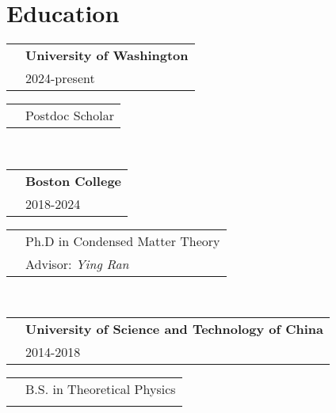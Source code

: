 \documentclass[10pt, letterpaper]{article}
\begin{document}
\section*{Education}
\begin{minipage}{0.55\linewidth}
    \begin{tabular}{ll}
         & {\bf University of Washington} \\
         & 2024-present
    \end{tabular}
\end{minipage}
\begin{minipage}{0.45\linewidth}
    \begin{tabular}{ll}
         & Postdoc Scholar \\
    \end{tabular}
\end{minipage}
\\[1em]
\begin{minipage}{0.55\linewidth}
    \begin{tabular}{ll}
         & {\bf Boston College} \\
         & 2018-2024
    \end{tabular}
\end{minipage}
\begin{minipage}{0.45\linewidth}
    \begin{tabular}{ll}
         & Ph.D in Condensed Matter Theory \\
         & Advisor: \emph{Ying Ran}
    \end{tabular}
\end{minipage}
\\[1em]
\begin{minipage}{0.55\linewidth}
    \begin{tabular}{ll}
         & {\bf University of Science and Technology of China} \\
         & 2014-2018
    \end{tabular}
\end{minipage}
\begin{minipage}{0.45\linewidth}
    \begin{tabular}{ll}
         & B.S. in Theoretical Physics \\
         & { }
    \end{tabular}
\end{minipage}



\end{document}
